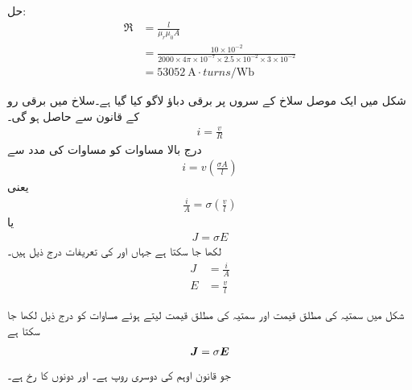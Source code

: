 حل:
\begin{align*}
\Re& = \frac{l}{\mu_r \mu_0 A}\\
&=\frac{10\times 10^{-2}}{2000 \times 4 \pi \times 10^{-7} \times 2.5 \times 10^{-2} \times 3 \times 10^{-2}}\\
&=\SI{53052}{\ampere \cdot turns \per \weber}
\end{align*}

شکل   میں ایک موصل سلاخ کے سروں پر برقی دباؤ    لاگو کیا گیا ہے۔سلاخ میں  برقی رو    کے قانون  سے حاصل ہو گی۔
\begin{align}
i=\frac{v}{R}
\end{align}
درج بالا مساوات کو مساوات   کی مدد سے
\begin{align}
i=v \left(\frac{\sigma A}{l}\right)
\end{align}
یعنی
\begin{align}
\frac{i}{A}=\sigma \left(\frac{v}{l} \right)
\end{align}
یا
\begin{align}\label{مساوات_مقناطیسی_دور_اوہم_قانون_کی_تفرق_شکل}
J =\sigma E
\end{align}
لکھا جا سکتا ہے جہاں   اور  کی تعریفات درج ذیل ہیں۔
\begin{align}
J&=\frac{i}{A} \label{مساوات_مقناطیسی_دور_کثافت_رو}\\
E&=\frac{v}{l} \label{مساوات_مقناطیسی_دور_برقی_شدت}
\end{align}

شکل   میں سمتیہ  کی مطلق قیمت   اور سمتیہ  کی مطلق قیمت  لیتے ہوئے  مساوات  کو درج ذیل لکھا جا سکتا ہے
\begin{align}
{\ensuremath{{\boldsymbol{J}}}}=\sigma {\ensuremath{{\boldsymbol{E}}}}
\end{align}
جو قانون اوہم کی دوسری روپ ہے۔  اور  دونوں کا رخ    ہے۔

